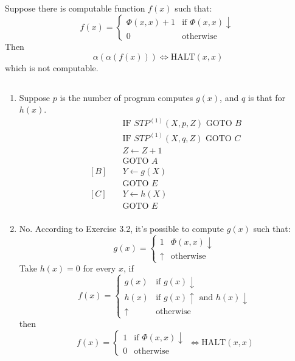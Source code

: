 \subsection{}
Suppose there is computable function $f(x)$ such that:
\[ f(x) =
     \begin{cases}
       \Phi(x,x)+1 & \text{if } \Phi(x,x)\downarrow \\
       0           & \text{otherwise}
     \end{cases} \]
Then
\[ \alpha(\alpha(f(x))) \Leftrightarrow \mathrm{HALT}(x,x) \]
which is not computable.


\subsection{}
\begin{enumerate}
  \item 
  Suppose $p$ is the number of program computes $g(x)$, and $q$ is
  that for $h(x)$.
  \begin{align*}
    [A]\quad & \text{IF } STP^{(1)}(X,p,Z) \text{ GOTO } B \\
         & \text{IF } STP^{(1)}(X,q,Z) \text{ GOTO } C \\
         & Z \gets Z + 1 \\
         & \text{GOTO } A \\
    [B]\quad & Y \gets g(X) \\
         & \text{GOTO } E \\
    [C]\quad & Y \gets h(X) \\
         & \text{GOTO } E \\
  \end{align*}
  
  \item 
  No. According to Exercise 3.2, it's possible to compute $g(x)$ such that:
  \[ g(x) = 
     \begin{cases}
       1        & \Phi(x,x) \downarrow \\
       \uparrow & \text{otherwise}
     \end{cases} \]
  Take $ h(x) = 0 $ for every $x$, if
  \[ f(x) =
     \begin{cases}
       g(x)    & \text{if } g(x) \downarrow \\
       h(x)     & \text{if } g(x) \uparrow \text{ and } h(x) \downarrow \\
       \uparrow & \text{otherwise}
     \end{cases} \]
  then
  \[ f(x) = 
     \begin{cases}
       1 & \text{if } \Phi(x,x) \downarrow \\
       0 & \text{otherwise}
     \end{cases}
     \Leftrightarrow \mathrm{HALT}(x,x) \]
\end{enumerate}


